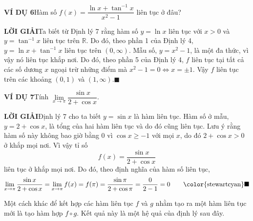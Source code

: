 \noindent
\begin{minipage}[t]{0.25\textwidth}
  \mbox{}
\end{minipage}%
\hfill
\begin{minipage}[t]{0.71\textwidth}
  \vspace{0pt}%
  \noindent\textbf{\textsf{\color{stewartcyan}VÍ DỤ 6}}\quad Hàm số $f(x) = \dfrac{\ln x + \tan^{-1} x}{x^2 - 1}$ liên tục ở đâu?

  \vspace{4pt}
  \noindent\textbf{\textsf{\color{stewartcyan}LỜI GIẢI}}\quad Ta biết từ Định lý 7 rằng hàm số $y = \ln x$ liên tục với $x > 0$ và $y = \tan^{-1} x$ liên tục trên $\mathbb{R}$. Do đó, theo phần 1 của Định lý 4, $y = \ln x + \tan^{-1} x$ liên tục trên $(0, \infty)$. Mẫu số, $y = x^2 - 1$, là một đa thức, vì vậy nó liên tục khắp nơi. Do đó, theo phần 5 của Định lý 4, $f$ liên tục tại tất cả các số dương $x$ ngoại trừ những điểm mà $x^2 - 1 = 0 \iff x = \pm 1$. Vậy $f$ liên tục trên các khoảng $(0, 1)$ và $(1, \infty)$.\hfill{\color{stewartcyan}$\blacksquare$}

  \vspace{8pt}
  \noindent\textbf{\textsf{\color{stewartcyan}VÍ DỤ 7}}\quad Tính $\lim\limits_{x \to \pi} \dfrac{\sin x}{2 + \cos x}$.

  \vspace{4pt}
  \noindent\textbf{\textsf{\color{stewartcyan}LỜI GIẢI}}\quad Định lý 7 cho ta biết $y = \sin x$ là hàm liên tục. Hàm số ở mẫu, $y = 2 + \cos x$, là tổng của hai hàm liên tục và do đó cũng liên tục. Lưu ý rằng hàm số này không bao giờ bằng $0$ vì $\cos x \geqslant -1$ với mọi $x$, do đó $2 + \cos x > 0$ ở khắp mọi nơi. Vì vậy tỉ số
  \[
  f(x) = \frac{\sin x}{2 + \cos x}
  \]
  liên tục ở khắp mọi nơi. Do đó, theo định nghĩa của hàm số liên tục,
  \[
  \lim_{x \to \pi} \frac{\sin x}{2 + \cos x} = \lim_{x \to \pi} f(x) = f(\pi) = \frac{\sin \pi}{2 + \cos \pi} = \frac{0}{2 - 1} = 0 \tag*{\color{stewartcyan}$\blacksquare$}
  \]

  \vspace{6pt}
  Một cách khác để kết hợp các hàm liên tục $f$ và $g$ nhằm tạo ra một hàm liên tục mới là tạo hàm hợp $f \circ g$. Kết quả này là một hệ quả của định lý sau đây.
\end{minipage}

\vspace{10pt}

